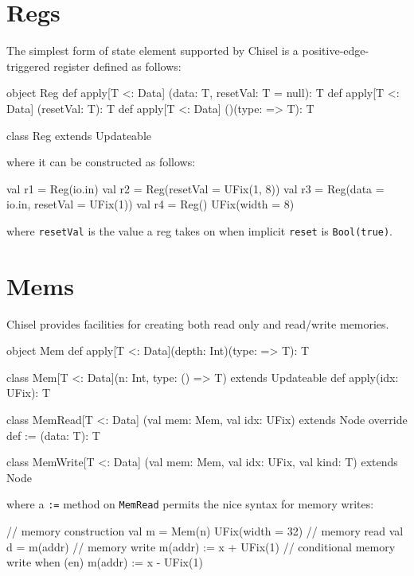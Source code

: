 \documentclass[10pt,twocolumn]{article}
\def\code#1{{\small\tt #1}}
\begin{document}
\section{Regs}

The simplest form of state element supported by Chisel is a
positive-edge-triggered register defined as follows:

\begin{scala}
object Reg {
  def apply[T <: Data]
        (data: T, resetVal: T = null): T
  def apply[T <: Data] (resetVal: T): T
  def apply[T <: Data] ()(type: => T): T
}
 
class Reg extends Updateable
\end{scala}

\noindent
where it can be constructed as follows:

\begin{scala}
val r1 = Reg(io.in)
val r2 = Reg(resetVal = UFix(1, 8))
val r3 = Reg(data = io.in, resetVal = UFix(1))
val r4 = Reg(){ UFix(width = 8) }
\end{scala}

\noindent
where \code{resetVal} is the value a reg takes on when implicit
\code{reset} is \code{Bool(true)}.

\section{Mems}

Chisel provides facilities for creating both read only and
read/write memories.  

\begin{scala}
object Mem {
  def apply[T <: Data](depth: Int)(type: => T): T
}

class Mem[T <: Data](n: Int, type: () => T) 
    extends Updateable {
  def apply(idx: UFix): T
}

class MemRead[T <: Data]
      (val mem: Mem, val idx: UFix) extends Node {
  override def := (data: T): T
}

class MemWrite[T <: Data]
      (val mem: Mem, val idx: UFix, val kind: T) 
    extends Node
\end{scala}

\noindent
where a \code{:=} method on \code{MemRead} permits the nice syntax for
memory writes:

\begin{scala}
// memory construction
val m = Mem(n){ UFix(width = 32) }
// memory read
val d = m(addr)
// memory write
m(addr) := x + UFix(1)
// conditional memory write
when (en) {
  m(addr) := x - UFix(1)
}
\end{scala}
\end{document}
